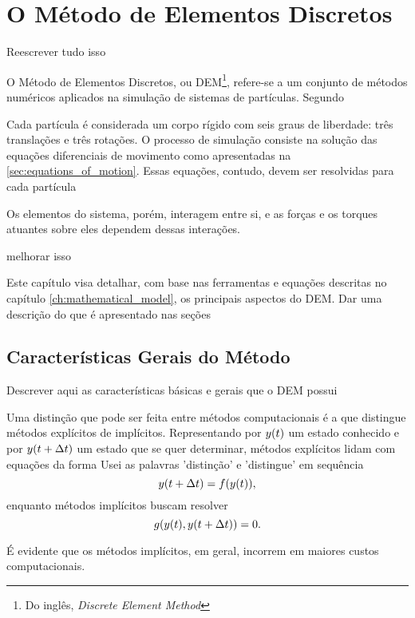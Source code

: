 \chapter{O Método de Elementos Discretos} \label{ch:discrete_element_method}

\alert{Reescrever tudo isso}

O Método de Elementos Discretos, ou DEM\footnote{Do inglês, \textit{Discrete Element Method}}, refere-se a um conjunto de métodos numéricos aplicados na simulação de sistemas de partículas. Segundo 

Cada partícula é considerada um corpo rígido com seis graus de liberdade: três translações e três rotações. O processo de simulação consiste na solução das equações diferenciais de movimento como apresentadas na \autoref{sec:equations_of_motion}. Essas equações, contudo, devem ser resolvidas para cada partícula

Os elementos do sistema, porém, interagem entre si, e as forças e os torques atuantes sobre eles dependem dessas interações.

\alert{melhorar isso}

Este capítulo visa detalhar, com base nas ferramentas e equações descritas no capítulo \ref{ch:mathematical_model}, os principais aspectos do DEM. \alert{Dar uma descrição do que é apresentado nas seções}

\section{Características Gerais do Método} \alert{Descrever aqui as características básicas e gerais que o DEM possui}

Uma distinção que pode ser feita entre métodos computacionais é a que distingue métodos explícitos de implícitos. Representando por \(y\pqty{t}\) um estado conhecido e por \(y\pqty{t+\Dt}\) um estado que se quer determinar, métodos explícitos lidam com equações da forma \alert{Usei as palavras 'distinção' e 'distingue' em sequência}
\begin{equation*}
	y\pqty{t+\Dt} = f\pqty{y\pqty{t}},
\end{equation*}
enquanto métodos implícitos buscam resolver
\begin{equation*}
	g\pqty{y\pqty{t}, y\pqty{t+\Dt}} = 0.
\end{equation*}

É evidente que os métodos implícitos, em geral, incorrem em maiores custos computacionais. 

